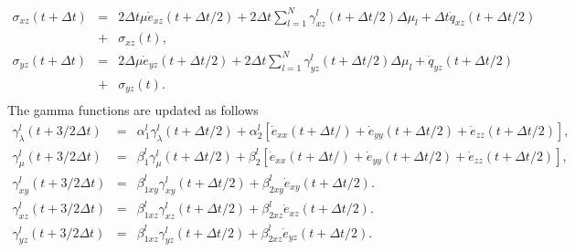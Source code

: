 \documentclass[11pt]{article}
\begin{document}
\begin{eqnarray}
  \sigma_{xz}(t+\Delta t) & = & 2\Delta t\mu \dot{e}_{xz}(t+\Delta t/2) + 2\Delta t \sum_{l=1}^N\gamma^l_{xz}(t+\Delta t/2)\Delta\mu_l+
                                    \Delta t \dot{q}_{xz}(t+\Delta t/2)\nonumber\\ 
                          & +& \sigma_{xz}(t),\\
  \sigma_{yz}(t+\Delta t) & = & 2\Delta \mu \dot{e}_{yz}(t+\Delta t/2) + 2\Delta t\sum_{l=1}^N\gamma^l_{yz}(t+\Delta t/2)\Delta\mu_l
                                   +\dot{q}_{yz}(t+\Delta t/2)\nonumber\\
                          & +& \sigma_{yz}(t)\nonumber.\\
                          \label{eq:stress}
\end{eqnarray} 
The gamma functions are updated as follows
\begin{eqnarray}
\gamma^l_{\lambda}(t+3/2\Delta t)  & = &\alpha^l_1 \gamma^l_{\lambda}(t+\Delta t/2) 
                        + \alpha^l_2\left[ \dot{e}_{xx}(t+\Delta t/)+ \dot{e}_{yy}(t+\Delta t/2)
                        +\dot{e}_{zz}(t+\Delta t/2)\right] ,\nonumber \\
\gamma^l_{\mu}(t+3/2\Delta t)     & = &\beta^l_1 \gamma^l_{\mu}(t+\Delta t/2) 
                        + \beta^l_2\left[ \dot{e}_{xx}(t+\Delta t/)+ \dot{e}_{yy}(t+\Delta t/2)
                        +\dot{e}_{zz}(t+\Delta t/2)\right] ,\nonumber \\
\gamma^l_{xy}(t+3/2\Delta t)      & = &\beta^l_{1xy} \gamma^l_{xy}(t + \Delta t/2) 
                        + \beta^l_{2xy}\dot{e}_{xy}(t+\Delta t/2).\nonumber\\
\gamma^l_{xz}(t+3/2\Delta t)      & = &\beta^l_{1xz} \gamma^l_{xz}(t + \Delta t/2) 
                        + \beta^l_{2xz}\dot{e}_{xz}(t+\Delta t/2).\nonumber\\
\gamma^l_{yz}(t+3/2\Delta t)      & = &\beta^l_{1xz} \gamma^l_{yz}(t + \Delta t/2) 
                        + \beta^l_{2xz}\dot{e}_{yz}(t+\Delta t/2).\nonumber\\
\end{eqnarray}
\end{document}
